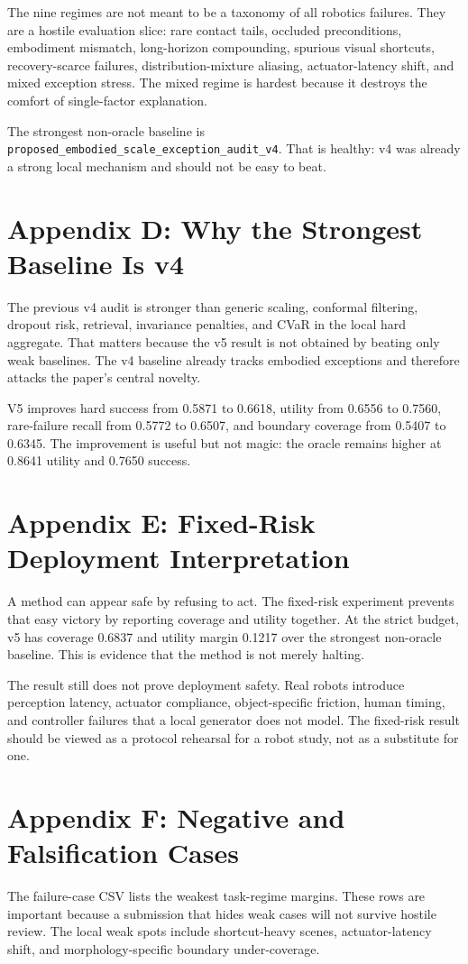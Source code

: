 \documentclass{article}
\begin{document}
The nine regimes are not meant to be a taxonomy of all robotics failures. They are a hostile evaluation slice: rare contact tails, occluded preconditions, embodiment mismatch, long-horizon compounding, spurious visual shortcuts, recovery-scarce failures, distribution-mixture aliasing, actuator-latency shift, and mixed exception stress. The mixed regime is hardest because it destroys the comfort of single-factor explanation.

The strongest non-oracle baseline is \texttt{proposed\_embodied\_scale\_exception\_audit\_v4}. That is healthy: v4 was already a strong local mechanism and should not be easy to beat.


\section{Appendix D: Why the Strongest Baseline Is v4}
The previous v4 audit is stronger than generic scaling, conformal filtering, dropout risk, retrieval, invariance penalties, and CVaR in the local hard aggregate. That matters because the v5 result is not obtained by beating only weak baselines. The v4 baseline already tracks embodied exceptions and therefore attacks the paper's central novelty.

V5 improves hard success from 0.5871 to 0.6618, utility from 0.6556 to 0.7560, rare-failure recall from 0.5772 to 0.6507, and boundary coverage from 0.5407 to 0.6345. The improvement is useful but not magic: the oracle remains higher at 0.8641 utility and 0.7650 success.


\section{Appendix E: Fixed-Risk Deployment Interpretation}
A method can appear safe by refusing to act. The fixed-risk experiment prevents that easy victory by reporting coverage and utility together. At the strict budget, v5 has coverage 0.6837 and utility margin 0.1217 over the strongest non-oracle baseline. This is evidence that the method is not merely halting.

The result still does not prove deployment safety. Real robots introduce perception latency, actuator compliance, object-specific friction, human timing, and controller failures that a local generator does not model. The fixed-risk result should be viewed as a protocol rehearsal for a robot study, not as a substitute for one.


\section{Appendix F: Negative and Falsification Cases}
The failure-case CSV lists the weakest task-regime margins. These rows are important because a submission that hides weak cases will not survive hostile review. The local weak spots include shortcut-heavy scenes, actuator-latency shift, and morphology-specific boundary under-coverage.
\end{document}

